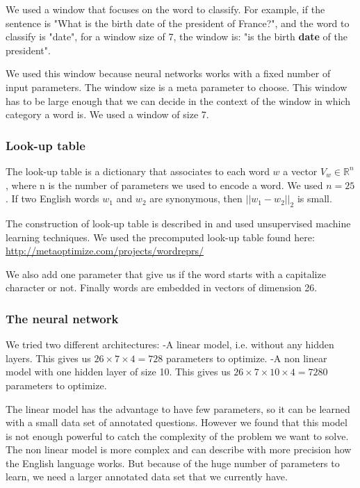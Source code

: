 We used a window that focuses on the word to classify. For example, if the sentence is "What is the birth date of the president of France?", and the word to classify is "date", for a window size of 7, the window is: "is the birth \textbf{date} of the president".

We used this window because neural networks works with a fixed number of input parameters. 
The window size is a meta parameter to choose. This window has to be large enough that we can decide in the context of the window in which category a word is. We used a window of size 7.

\subsubsection{Look-up table}

The look-up table is a dictionary that associates to each word $w$ a vector $V_w \in \mathbb{R}^n$, where n is the number of parameters we used to encode a word. We used $n=25$.
If two English words $w_1$ and $w_2$ are synonymous, then $||w_1-w_2||_2$ is small.

The construction of look-up table is described in \cite{collobert} and used unsupervised machine learning techniques.
We used the precomputed look-up table found here: \url{http://metaoptimize.com/projects/wordreprs/}

We also add one parameter that give us if the word starts with a capitalize character or not. Finally words are embedded in vectors of dimension 26. 

\subsubsection{The neural network}

We tried two different architectures:
-A linear model, i.e. without any hidden layers. This gives us $26\times 7\times 4 = 728$ parameters to optimize. 
-A non linear model with one hidden layer of size 10. This gives us $26\times 7\times 10\times 4 = 7280$ parameters to optimize.

The linear model has the advantage to have few parameters, so it can be learned with a small data set of annotated questions. However we found that this model is not enough powerful to catch the complexity of the problem we want to solve.
The non linear model is more complex and can describe with more precision how the English language works. But because of the huge number of parameters to learn, we need a larger annotated data set that we currently have.

